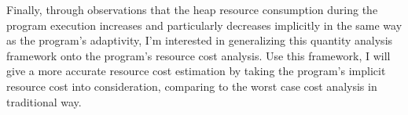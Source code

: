    Finally, through observations that the heap resource consumption during the program 
   execution increases and particularly decreases implicitly in the same way as the program's adaptivity, 
   I'm interested in generalizing this quantity analysis framework onto the program's resource cost analysis. Use this framework,
   I will give
   a more accurate resource cost estimation by taking the program's implicit resource cost into consideration, comparing 
   to the worst case cost analysis in traditional way.
